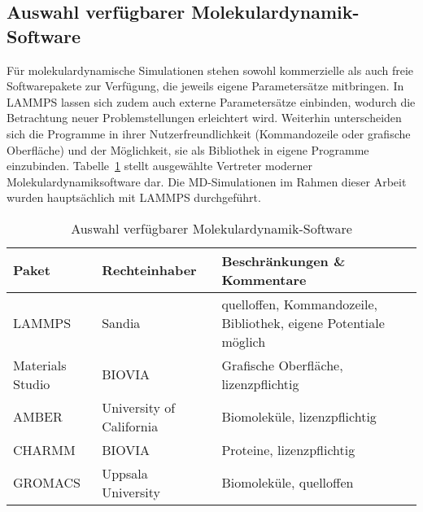 \subsection{Auswahl verfügbarer Molekulardynamik-Software}

Für molekulardynamische Simulationen stehen sowohl kommerzielle als auch freie Softwarepakete zur Verfügung, die jeweils eigene Parametersätze mitbringen.
In LAMMPS lassen sich zudem auch externe Parametersätze einbinden, wodurch die Betrachtung neuer Problemstellungen erleichtert wird.
Weiterhin unterscheiden sich die Programme in ihrer Nutzerfreundlichkeit (Kommandozeile oder grafische Oberfläche) und der Möglichkeit, sie als Bibliothek in eigene Programme einzubinden.
Tabelle~\ref{tab:mdsoftware} stellt ausgewählte Vertreter moderner Molekulardynamiksoftware dar.
Die MD-Simulationen im Rahmen dieser Arbeit wurden hauptsächlich mit LAMMPS durchgeführt.

\begin{table}[hb]
  \oddrowcolors
  \caption{Auswahl verfügbarer Molekulardynamik-Software}
  \label{tab:mdsoftware}
  \begin{tabularx}{\textwidth}{|llX|}
    \hline
    \textbf{Paket}                                                               & \textbf{Rechteinhaber}   & \textbf{Beschränkungen \& Kommentare}                            \\
    \hline
    LAMMPS\cite{plimpton_lammps_2014,plimpton_fast_1995}                         & Sandia                   & quelloffen, Kommandozeile, Bibliothek, eigene Potentiale möglich \\
    Materials Studio\cite{biovia_materials_2014}                                 & BIOVIA                   & Grafische Oberfläche, lizenzpflichtig                            \\
    AMBER\cite{case_amber_2014,case_amber_2005}                                  & University of California & Biomoleküle, lizenzpflichtig                                     \\
    CHARMM\cite{brooks_charmm_2014,brooks_charmm:_1983,brooks_charmm:_2009}      & BIOVIA                   & Proteine, lizenzpflichtig                                        \\
    GROMACS\cite{lindahl_gromacs_2014,berendsen_gromacs:_1995,hess_gromacs_2008} & Uppsala University       & Biomoleküle, quelloffen                                          \\
    \hline
  \end{tabularx}
\end{table}

